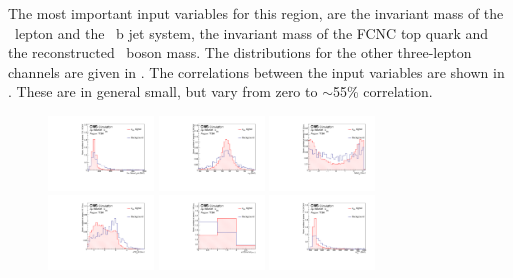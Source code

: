 The most important input variables for this region, are the invariant mass of the \PW\ lepton and the \SM\ b jet system,  the invariant mass of the FCNC top quark and the reconstructed \PZ~boson mass. The distributions for the other three-lepton channels are given in . The correlations between the input  variables are shown in . These are in general small, but vary from zero to $\sim$55\% correlation. 
\begin{figure}[htbp]
	\centering
	\includegraphics[width=0.25\textwidth]{6_Search/Figures/PlotsTechnics/mlbZcttoppairuuu_norm}
	\includegraphics[width=0.25\textwidth]{6_Search/Figures/PlotsTechnics/Zboson_MZcttoppairuuu_norm}
	\includegraphics[width=0.25\textwidth]{6_Search/Figures/PlotsTechnics/dPhiZWlepZcttoppairuuu_norm}
	\includegraphics[width=0.25\textwidth]{6_Search/Figures/PlotsTechnics/dRWlepbZcttoppairuuu_norm}
	\includegraphics[width=0.25\textwidth]{6_Search/Figures/PlotsTechnics/NJets_CSVv2MZcttoppairuuu_norm}
	\includegraphics[width=0.25\textwidth]{6_Search/Figures/PlotsTechnics/FCNCtop_MZcttoppairuuu_norm}

\end{figure}
